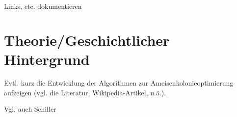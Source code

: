 Links, etc. dokumentieren


\vspace*{1cm}


\section{Theorie/Geschichtlicher Hintergrund} 

Evtl. kurz die Entwicklung der Algorithmen zur Ameisenkolonieoptimierung aufzeigen (vgl. die Literatur, Wikipedia-Artikel, u.ä.).

Vgl. auch Schiller


\vspace*{1cm}
